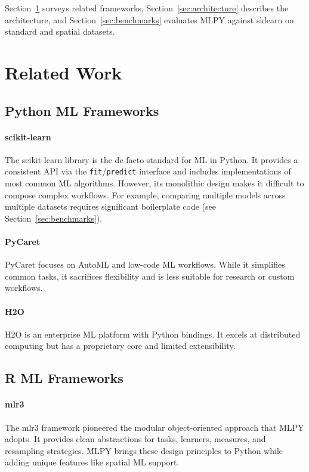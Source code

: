 \documentclass[twoside,11pt]{article}
\begin{document}
Section~\ref{sec:related} surveys related frameworks, Section~\ref{sec:architecture}
describes the architecture, and Section~\ref{sec:benchmarks} evaluates MLPY against
sklearn on standard and spatial datasets.

\section{Related Work}
\label{sec:related}

\subsection{Python ML Frameworks}

\paragraph{scikit-learn}
The scikit-learn library \citep{pedregosa2011scikit} is the de facto standard
for ML in Python. It provides a consistent API via the \texttt{fit}/\texttt{predict}
interface and includes implementations of most common ML algorithms. However,
its monolithic design makes it difficult to compose complex workflows. For
example, comparing multiple models across multiple datasets requires significant
boilerplate code (see Section~\ref{sec:benchmarks}).

\paragraph{PyCaret}
PyCaret \citep{pycaret} focuses on AutoML and low-code ML workflows. While it
simplifies common tasks, it sacrifices flexibility and is less suitable for
research or custom workflows.

\paragraph{H2O}
H2O \citep{h2o} is an enterprise ML platform with Python bindings. It excels at
distributed computing but has a proprietary core and limited extensibility.

\subsection{R ML Frameworks}

\paragraph{mlr3}
The mlr3 framework \citep{lang2019mlr3} pioneered the modular object-oriented
approach that MLPY adopts. It provides clean abstractions for tasks, learners,
measures, and resampling strategies. MLPY brings these design principles to
Python while adding unique features like spatial ML support.
\end{document}
